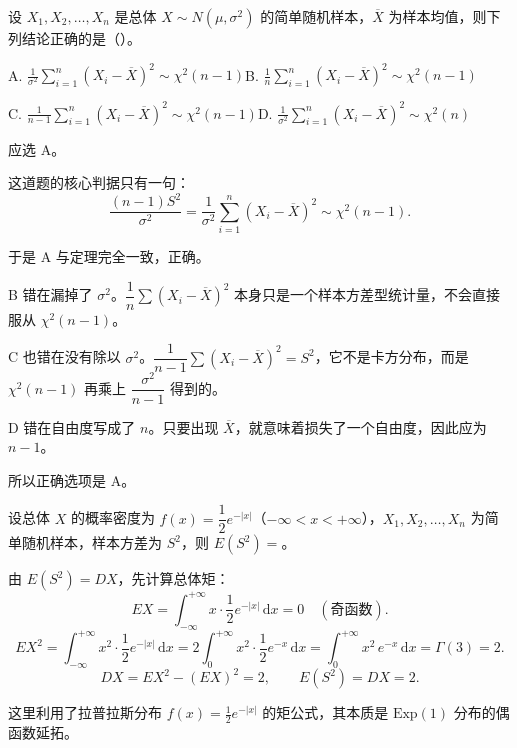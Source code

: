 ﻿\documentclass[lang=cn,11pt]{elegantbook}
\begin{document}
\begin{exercise}\label{exer:6-s2-chi2}
设 \(X_1, X_2, \dots, X_n\) 是总体 \(X \sim N(\mu, \sigma^2)\) 的简单随机样本，\(\overline{X}\) 为样本均值，则下列结论正确的是（\quad）。\par
A. \(\displaystyle\frac{1}{\sigma^2}\sum_{i=1}^{n}(X_i-\overline{X})^2 \sim \chi^2(n-1)\)\qquad B. \(\displaystyle\frac{1}{n}\sum_{i=1}^{n}(X_i-\overline{X})^2 \sim \chi^2(n-1)\)\par
C. \(\displaystyle\frac{1}{n-1}\sum_{i=1}^{n}(X_i-\overline{X})^2 \sim \chi^2(n-1)\)\qquad D. \(\displaystyle\frac{1}{\sigma^2}\sum_{i=1}^{n}(X_i-\overline{X})^2 \sim \chi^2(n)\)
\end{exercise}
\begin{solution}
应选 A。

这道题的核心判据只有一句：
\[
\frac{(n-1)S^2}{\sigma^2}
=\frac{1}{\sigma^2}\sum_{i=1}^{n}(X_i-\overline{X})^2
\sim \chi^2(n-1).
\]

于是 A 与定理完全一致，正确。

B 错在漏掉了 \(\sigma^2\)。\(\dfrac{1}{n}\sum(X_i-\overline{X})^2\) 本身只是一个样本方差型统计量，不会直接服从 \(\chi^2(n-1)\)。

C 也错在没有除以 \(\sigma^2\)。\(\dfrac{1}{n-1}\sum(X_i-\overline{X})^2=S^2\)，它不是卡方分布，而是 \(\chi^2(n-1)\) 再乘上 \(\dfrac{\sigma^2}{n-1}\) 得到的。

D 错在自由度写成了 \(n\)。只要出现 \(\overline{X}\)，就意味着损失了一个自由度，因此应为 \(n-1\)。

所以正确选项是 A。
\end{solution}

\begin{exercise}[样本方差的期望] \label{ex:statistic_05}
设总体 \(X\) 的概率密度为 \(f(x)=\dfrac{1}{2}e^{-|x|}\)（\(-\infty<x<+\infty\)），\(X_1,X_2,\dots,X_n\) 为简单随机样本，样本方差为 \(S^2\)，则 \(E(S^2)=\)\underline{\qquad}。
\end{exercise}
\begin{solution}
由 \(E(S^2)=DX\)，先计算总体矩：
\[
EX=\int_{-\infty}^{+\infty}x\cdot\frac{1}{2}e^{-|x|}\,\mathrm{d}x=0 \quad(\text{奇函数}).
\]
\[
EX^2=\int_{-\infty}^{+\infty}x^2\cdot\frac{1}{2}e^{-|x|}\,\mathrm{d}x
=2\int_0^{+\infty}x^2\cdot\frac{1}{2}e^{-x}\,\mathrm{d}x
=\int_0^{+\infty}x^2\,e^{-x}\,\mathrm{d}x=\Gamma(3)=2.
\]
\[
DX=EX^2-(EX)^2=2,\qquad E(S^2)=DX=2.
\]
\begin{note}
这里利用了拉普拉斯分布 \(f(x)=\frac{1}{2}e^{-|x|}\) 的矩公式，其本质是 \(\text{Exp}(1)\) 分布的偶函数延拓。
\end{note}
\end{solution}
\end{document}
